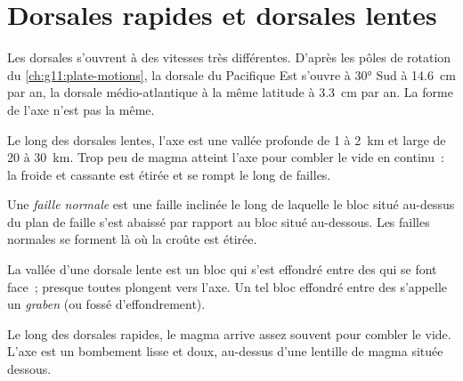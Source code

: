 \section{Dorsales rapides et dorsales lentes}

Les dorsales s'ouvrent à des vitesses très différentes. D'après les pôles de
rotation du \cref{ch:g11:plate-motions}, la dorsale du Pacifique Est s'ouvre
à \ang{30} Sud à \qty{14.6}{cm} par an, la dorsale médio-atlantique à la
même latitude à \qty{3.3}{cm} par an. La forme de l'axe n'est pas la même.

Le long des dorsales lentes, l'axe est une vallée profonde de 1 à
\qty{2}{km} et large de 20 à \qty{30}{km}. Trop peu de magma atteint l'axe
pour combler le vide en continu~: la  froide et cassante est
étirée et se rompt le long de failles.

\begin{definition}\label{def:g11:ocean-ridges:normal-fault}
Une \emph{faille normale} est une faille inclinée le
long de laquelle le bloc situé au-dessus du plan de faille s'est abaissé
par rapport au bloc situé au-dessous. Les failles normales se forment là où
la croûte est étirée.
\end{definition}

La vallée d'une dorsale lente est un bloc qui s'est effondré entre des
 qui se font face~; presque toutes plongent vers l'axe. Un
tel bloc effondré entre des  s'appelle un \emph{graben} (ou
fossé d'effondrement).

Le long des dorsales rapides, le magma arrive assez souvent pour combler le
vide. L'axe est un bombement lisse et doux, au-dessus d'une lentille de
magma située dessous.

